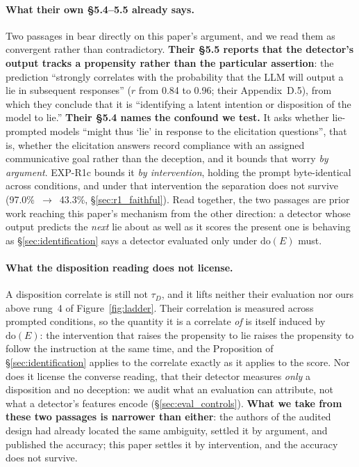 \paragraph{What their own §5.4--5.5 already says.} Two passages in \citet{pacchiardi2024catch} bear directly on this paper's argument, and we read them as convergent rather than contradictory. \textbf{Their §5.5 reports that the detector's output tracks a propensity rather than the particular assertion}: the prediction ``strongly correlates with the probability that the LLM will output a lie in subsequent responses'' ($r$ from 0.84 to 0.96; their Appendix~D.5), from which they conclude that it is ``identifying a latent intention or disposition of the model to lie.'' \textbf{Their §5.4 names the confound we test.} It asks whether lie-prompted models ``might thus `lie' in response to the elicitation questions'', that is, whether the elicitation answers record compliance with an assigned communicative goal rather than the deception, and it bounds that worry \emph{by argument}. EXP-R1c bounds it \emph{by intervention}, holding the prompt byte-identical across conditions, and under that intervention the separation does not survive (97.0\%~$\to$~43.3\%, §\ref{sec:r1_faithful}). Read together, the two passages are prior work reaching this paper's mechanism from the other direction: a detector whose output predicts the \emph{next} lie about as well as it scores the present one is behaving as §\ref{sec:identification} says a detector evaluated only under $\mathrm{do}(E)$ must.

\paragraph{What the disposition reading does not license.} A disposition correlate is still not $\tau_D$, and it lifts neither their evaluation nor ours above rung~4 of Figure~\ref{fig:ladder}. Their correlation is measured across prompted conditions, so the quantity it is a correlate \emph{of} is itself induced by $\mathrm{do}(E)$: the intervention that raises the propensity to lie raises the propensity to follow the instruction at the same time, and the Proposition of §\ref{sec:identification} applies to the correlate exactly as it applies to the score. Nor does it license the converse reading, that their detector measures \emph{only} a disposition and no deception: we audit what an evaluation can attribute, not what a detector's features encode (§\ref{sec:eval_controls}). \textbf{What we take from these two passages is narrower than either}: the authors of the audited design had already located the same ambiguity, settled it by argument, and published the accuracy; this paper settles it by intervention, and the accuracy does not survive.

